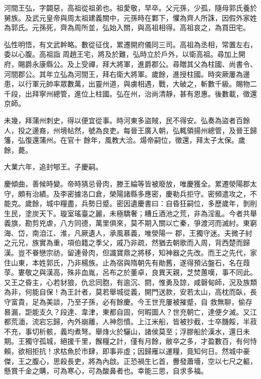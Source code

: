 
\begin{pinyinscope}

 河間王弘，字闢惡，高祖從祖弟也。祖愛敬，早卒。父元孫，少孤，隨母郭氏養於舅族。及武元皇帝與周太祖建義關中，元孫時在鄴下，懼為齊人所誅，因假外家姓為郭氏。元孫死，齊為周所並，弘始入關，與高祖相得。高祖哀之，為買田宅。



 弘性明悟，有文武幹略。數從征伐，累遷開府儀同三司。高祖為丞相，常置左右，委以心腹。高祖詣
 周趙王宅，將及於難，弘時立於戶外，以衛高祖。尋加上開府，賜爵永康縣公。及上受禪，拜大將軍，進爵郡公。尋贈其父為柱國、尚書令、河間郡公。其年立弘為河間王，拜右衛大將軍。歲餘，進授柱國。時突厥屢為邊患，以行軍元帥率眾數萬，出靈州道，與虜相遇，戰，大破之，斬數千級。賜物二千段，出拜寧州總管，進位上柱國。弘在州，治尚清靜，甚有恩惠。後數載，徵還京師。



 未幾，拜蒲州刺史，得以便宜從事。時河東多盜賊，民不得安。弘奏為盜者百餘人，投之邊裔，州境帖然，號為良吏。每晉王廣入朝，弘輒領揚州總管，及晉王歸籓，弘復還蒲州。在官十
 餘年，風教大洽。煬帝嗣位，徵還，拜太子太保。歲餘，薨。



 大業六年，追封郇王。子慶嗣。



 慶傾曲，善候時變。帝時猜忌骨肉，滕王綸等皆被廢放，唯慶獲全。累遷滎陽郡太守，頗有治績。及李密據洛口倉，榮陽諸縣多應密，慶勒兵拒守。密頻遣攻之，不能克。歲餘，城中糧盡，兵勢日蹙。密因遺慶書曰：自昏狂嗣位，多歷歲年，剝削生民，塗炭天下。璇室瑤臺之麗，未極驕奢；糟丘酒池之荒，非為淫亂。今者共舉義旗，勘剪兇虐，八方同德，萬里俱來，莫不期入關以亡秦，爭渡河而滅紂。東窮海、岱，南洎江、淮，凡厥遺人，承風慕義，唯滎陽一
 郡，王獨守迷。夫微子紂之元兄，族實為重，項伯籍之季父，戚乃非疏，然猶去朝歌而入周，背西楚而歸漢。豈不眷戀宗祊，留連骨肉，但識寶鼎之將移，知神器之先改。而王之先代，家住山東，本姓郭氏，乃非楊族。止為宿與隋朝先有勛舊，遂得預沾盤石，名在葭莩。婁敬之與漢高，殊非血胤，呂布之於董卓，良異天親，芝焚蕙嘆，事不同此。又王之昏主，心若豺狼，仇忿同胞，有逾沉、閼，惟勇及諒，咸磬甸師，況及族類為非，何能自保！為王計者，莫若舉城從義，開門送款，安若太山，高枕而臥，長守富貴，足為美談，乃至子孫，必有餘慶。今王世充屢被摧蹙，自
 救無聊，偷存晷漏，詎能支久？段達、韋津，東都自固，何暇圖人？世充朝亡，達便夕滅。又江都荒湎，流宕忘歸，內外崩離，人神怨憤。上江米船，皆被抄截，士卒饑餒，半菽不充，事切析骸，義均煮弩。舉烽火於驪山，諸侯莫至；浮膠船於漢水，還日未期。王獨守孤城，絕援千里，餱糧之計，僅有月餘，敝卒之多，才盈數百，有何恃賴，欲相拒抗！求枯魚於市肆，即事非虛；因歸雁以運糧，竟知何日。然城中豪傑，王之腹心，思殺長吏，將為內啟。正恐禍生匕首，釁發蕭墻，空以七尺之軀，懸賞千金之購，可為寒心，可為酸鼻者也。幸能三思，自求多福。




\end{pinyinscope}
